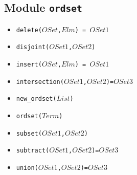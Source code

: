 \documentclass[10pt]{article}
\begin{document}
\begin{multicols}{2}
\section*{Module \texttt{ordset}}
\begin{scriptsize}
\begin{itemize}
\item \texttt{delete($OSet$,$Elm$) = $OSet1$}
\item \texttt{disjoint($OSet1$,$OSet2$)}
\item \texttt{insert($OSet$,$Elm$) = $OSet1$}
\item \texttt{intersection($OSet1$,$OSet2$)=$OSet3$}
\item \texttt{new\_ordset($List$)}
\item \texttt{ordset($Term$)}
\item \texttt{subset($OSet1$,$OSet2$)}
\item \texttt{subtract($OSet1$,$OSet2$)=$OSet3$}
\item \texttt{union($OSet1$,$OSet2$)=$OSet3$}
\end{itemize}
\end{scriptsize}


\end{multicols}
\end{document}
